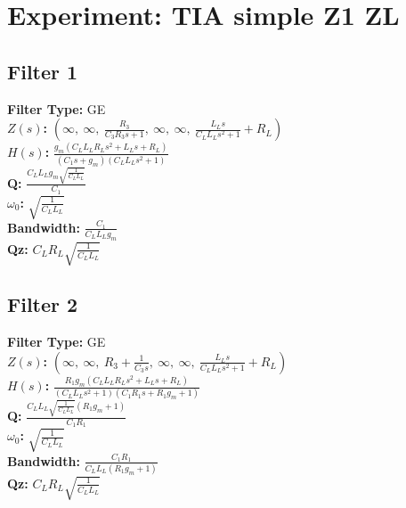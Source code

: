 \documentclass{article}
\begin{document}
        \section*{Experiment: TIA simple Z1 ZL}
\subsection*{Filter 1}
\textbf{Filter Type:} GE \\ 
\textbf{$Z(s)$:} $\left( \infty, \  \infty, \  \frac{R_{3}}{C_{3} R_{3} s + 1}, \  \infty, \  \infty, \  \frac{L_{L} s}{C_{L} L_{L} s^{2} + 1} + R_{L}\right)$ \\ 
\textbf{$H(s)$:} $\frac{g_{m} \left(C_{L} L_{L} R_{L} s^{2} + L_{L} s + R_{L}\right)}{\left(C_{1} s + g_{m}\right) \left(C_{L} L_{L} s^{2} + 1\right)}$ \\ 
\textbf{Q:} $\frac{C_{L} L_{L} g_{m} \sqrt{\frac{1}{C_{L} L_{L}}}}{C_{1}}$ \\ 
\textbf{$\omega_0$:} $\sqrt{\frac{1}{C_{L} L_{L}}}$ \\ 
\textbf{Bandwidth:} $\frac{C_{1}}{C_{L} L_{L} g_{m}}$ \\ 
\textbf{Qz:} $C_{L} R_{L} \sqrt{\frac{1}{C_{L} L_{L}}}$ \\ 
\subsection*{Filter 2}
\textbf{Filter Type:} GE \\ 
\textbf{$Z(s)$:} $\left( \infty, \  \infty, \  R_{3} + \frac{1}{C_{3} s}, \  \infty, \  \infty, \  \frac{L_{L} s}{C_{L} L_{L} s^{2} + 1} + R_{L}\right)$ \\ 
\textbf{$H(s)$:} $\frac{R_{1} g_{m} \left(C_{L} L_{L} R_{L} s^{2} + L_{L} s + R_{L}\right)}{\left(C_{L} L_{L} s^{2} + 1\right) \left(C_{1} R_{1} s + R_{1} g_{m} + 1\right)}$ \\ 
\textbf{Q:} $\frac{C_{L} L_{L} \sqrt{\frac{1}{C_{L} L_{L}}} \left(R_{1} g_{m} + 1\right)}{C_{1} R_{1}}$ \\ 
\textbf{$\omega_0$:} $\sqrt{\frac{1}{C_{L} L_{L}}}$ \\ 
\textbf{Bandwidth:} $\frac{C_{1} R_{1}}{C_{L} L_{L} \left(R_{1} g_{m} + 1\right)}$ \\ 
\textbf{Qz:} $C_{L} R_{L} \sqrt{\frac{1}{C_{L} L_{L}}}$ \\ 
\end{document}
